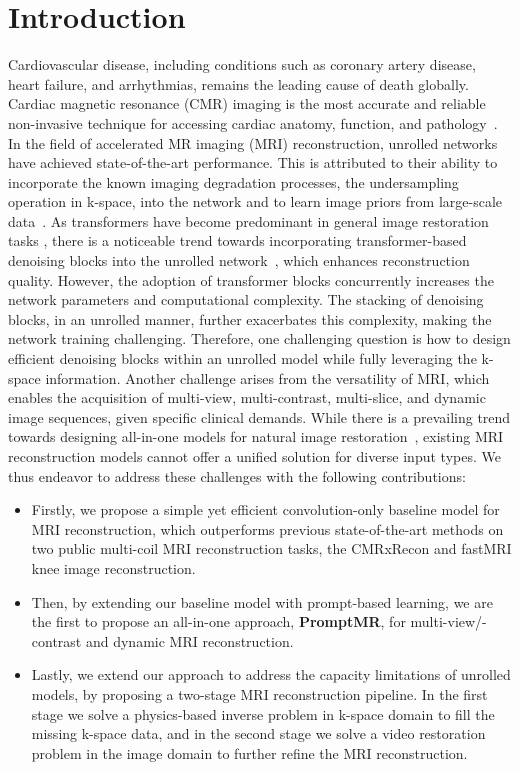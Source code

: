 \documentclass[runningheads]{llncs}
\begin{document}
 




\section{Introduction}
Cardiovascular disease, including conditions such as coronary artery disease, heart failure, and arrhythmias, remains the leading cause of death globally. Cardiac magnetic resonance (CMR) imaging is the most accurate and reliable non-invasive technique for accessing cardiac anatomy, function, and pathology~\cite{rajiah2023cardiac}. 
In the field of accelerated MR imaging (MRI) reconstruction, unrolled networks have achieved state-of-the-art performance.
This is attributed to their ability to incorporate the known imaging degradation processes, the undersampling operation in k-space, 
into the network and to learn image priors from large-scale data~\cite{sriram2020end,fabian2022humus}. As transformers have become predominant in general image restoration tasks \cite{zamir2022restormer,liang2021swinir}, there is a noticeable trend towards incorporating transformer-based denoising blocks into the unrolled network~\cite{fabian2022humus}, which enhances reconstruction quality. However, the adoption of transformer blocks concurrently increases the network parameters and computational complexity. The stacking of denoising blocks, in an unrolled manner, further exacerbates this complexity, making the network training challenging.
Therefore, one challenging question is how to design efficient denoising blocks within an unrolled model while fully leveraging the k-space information. Another challenge arises from the versatility of MRI, which enables the acquisition of multi-view, multi-contrast, multi-slice, and dynamic image sequences, given specific clinical demands. 
While there is a prevailing trend towards designing all-in-one models for natural image restoration~\cite{li2022all,potlapalli2023promptir}, existing MRI reconstruction models cannot offer a unified solution for diverse input types. We thus endeavor to address these challenges with the following contributions:
\begin{itemize}[label=]
    \item Firstly, we propose a simple yet efficient convolution-only baseline model for MRI reconstruction, which outperforms previous state-of-the-art methods on two public multi-coil MRI reconstruction tasks, the CMRxRecon and fastMRI knee image reconstruction.
    \item Then, by extending our baseline model with prompt-based learning, we are the first to propose an all-in-one approach, \textbf{PromptMR}, for multi-view/-contrast and dynamic MRI reconstruction.
    \item Lastly, we extend our approach to address the capacity limitations of unrolled models, by proposing a two-stage MRI reconstruction pipeline. In the  first stage we solve a physics-based inverse problem in k-space domain to fill the missing k-space data, and in the second stage we solve a video restoration problem in the image domain to further refine the MRI reconstruction.
\end{itemize}
\end{document}
